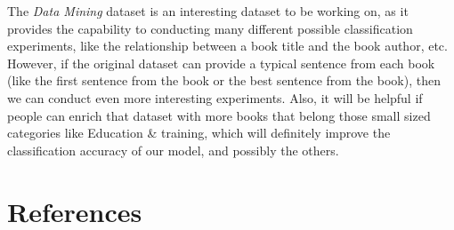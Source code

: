 \documentclass[jou,apacite, 10px]{apa6}
\begin{document}
 The \textit{Data Mining} dataset is an interesting dataset to be working on, as it provides the capability to conducting many different possible classification experiments, like the relationship between a book title and the book author, etc. However, if the original dataset can provide a typical sentence from each book (like the first sentence from the book or the best sentence from the book), then we can conduct even more interesting experiments. Also, it will be helpful if people can enrich that dataset with more books that belong those small sized categories like Education \& training, which will definitely improve the classification accuracy of our model, and possibly the others.

\section{References}
\end{document}
